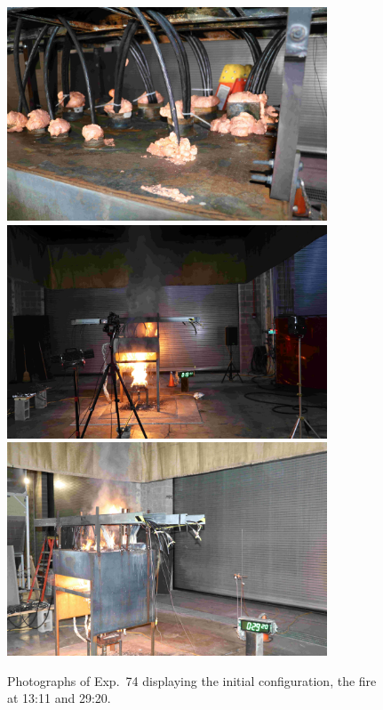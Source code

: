 \begin{figure}[p]
\centering
\includegraphics[height=2.50in]{../FIGURES/Test_74_Photo_1} \\ \vspace{0.1in}
\includegraphics[height=2.50in]{../FIGURES/Test_74_Photo_2} \\ \vspace{0.1in}
\includegraphics[height=2.50in]{../FIGURES/Test_74_Photo_3}
\caption[Photographs of Exp.~74]{Photographs of Exp.~74 displaying the initial configuration, the fire at 13:11 and 29:20.}
\label{fig:Test_74_photos}
\end{figure}


\clearpage

